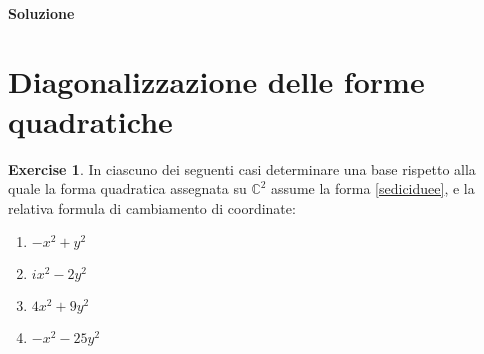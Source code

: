 \documentclass{article}
\theoremstyle{plain}
\theoremstyle{definition}
\newtheorem{xca}[exmp]{Exercise}
\theoremstyle{remark}
\begin{document}
\paragraph{Soluzione}


\newpage
\section{Diagonalizzazione delle forme quadratiche}
\vspace{20pt}

\begin{bxthm}
\begin{xca}
    In ciascuno dei seguenti casi determinare una base rispetto alla quale la forma quadratica assegnata su $\mathbb{C}^2$ assume la forma \ref{sediciduee}, e la relativa 
    formula di cambiamento di coordinate:
    \begin{multicols}{4}
        \begin{enumerate}
            \item $-x^2+y^2$
            \item $ix^2-2y^2$
            \item $4x^2+9y^2$
            \item $-x^2-25y^2$
        \end{enumerate}
    \end{multicols}
\end{xca}
\end{bxthm}
\end{document}
